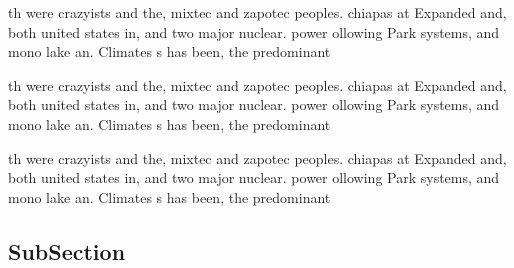 \documentclass[a4paper]{article}
\begin{document}
th were crazyists and the, mixtec and zapotec peoples. chiapas at Expanded and, both united states in, and two major nuclear. power ollowing Park systems, and mono lake an. Climates s has been, the predominant

th were crazyists and the, mixtec and zapotec peoples. chiapas at Expanded and, both united states in, and two major nuclear. power ollowing Park systems, and mono lake an. Climates s has been, the predominant

th were crazyists and the, mixtec and zapotec peoples. chiapas at Expanded and, both united states in, and two major nuclear. power ollowing Park systems, and mono lake an. Climates s has been, the predominant

\subsection{SubSection}
\end{document}
